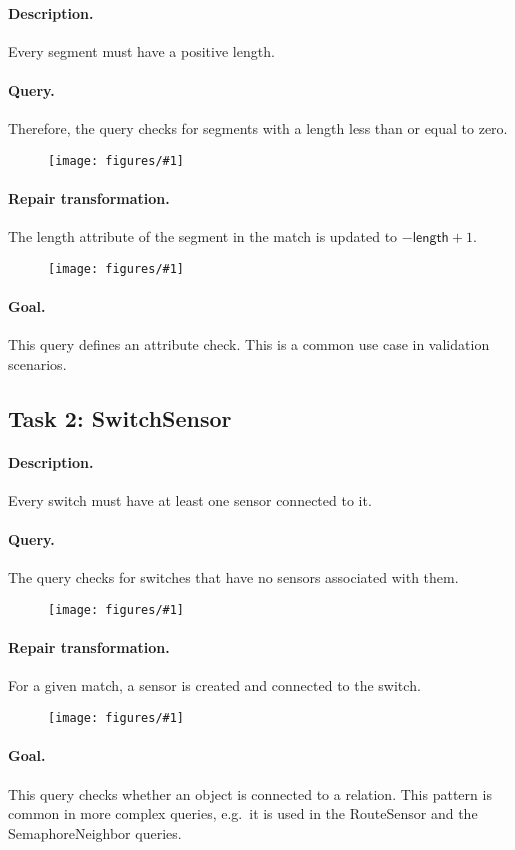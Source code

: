 \documentclass[submission,copyright,creativecommons]{eptcs}
\newcommand{\ttcpattern}[1]{
\begin{figure}[H] 
	\centering
	\texttt{[image: figures/\#1]}
\end{figure}}
\begin{document}
\paragraph{Description.} Every segment must have a positive length.
\paragraph{Query.} Therefore, the query checks for segments with a length less than or equal to zero.
\ttcpattern{pattern-poslength}
\paragraph{Repair transformation.} The \textsf{length} attribute of the \textsf{segment} in the match is updated to $- \mathsf{length} + 1$.
\ttcpattern{transformation-poslength}
\paragraph{Goal.} This query defines an attribute check. This is a common use case in validation scenarios.


\subsection{Task 2: SwitchSensor}
\label{switchsensor}
\paragraph{Description.} Every switch must have at least one sensor connected to it. 
\paragraph{Query.} The query checks for switches that have no sensors associated with them.
\ttcpattern{pattern-switchsensor}
\paragraph{Repair transformation.} For a given match, a \textsf{sensor} is created and connected to the \textsf{switch}.
\ttcpattern{transformation-switchsensor}
\paragraph{Goal.} This query checks whether an object is connected to a relation. This pattern is common in more complex queries, e.g.\ it is used in the \textsf{RouteSensor} and the \textsf{SemaphoreNeighbor} queries.
\end{document}
